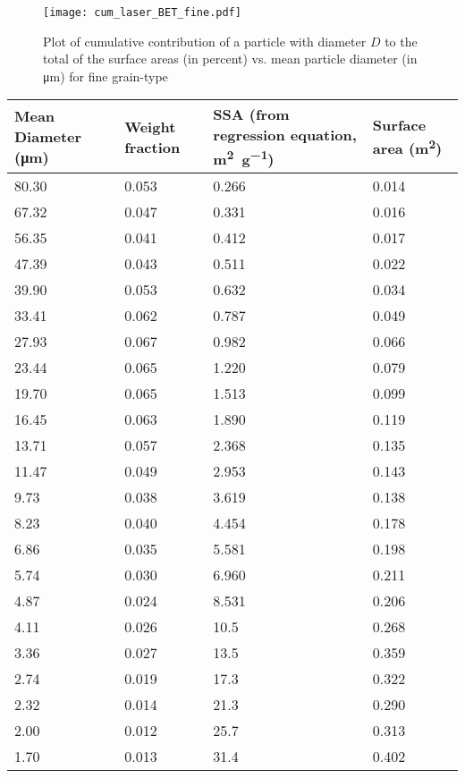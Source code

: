  
\begin{figure}[h]
\centering
\texttt{[image: cum\_laser\_BET\_fine.pdf]}
\caption{Plot of cumulative contribution of a particle with diameter $D$ to the total of the surface areas (in percent) vs. mean particle diameter (in \si{\micro\meter}) for fine grain-type}
\label{fig:app_contri}
\end{figure}
 
 \begin{table}[h!]
   \centering
     \begin{tabularx}{\linewidth}{|X|X|X|X|}
     \toprule
    \textbf{Mean Diameter (\si{\micro\meter})} & \textbf{Weight fraction} & \textbf{SSA  (from regression equation, \si{\square\meter\per\gram})} & \textbf{Surface area (\si{\square\metre})} \\
    \midrule
     80.30 & 0.053 & 0.266 & 0.014 \\
     67.32 & 0.047 & 0.331 & 0.016 \\
     56.35 & 0.041 & 0.412 & 0.017 \\
     47.39 & 0.043 & 0.511 & 0.022 \\
     39.90 & 0.053 & 0.632 & 0.034 \\
     33.41 & 0.062 & 0.787 & 0.049 \\
     27.93 & 0.067 & 0.982 & 0.066 \\
     23.44 & 0.065 & 1.220 & 0.079 \\
     19.70 & 0.065 & 1.513 & 0.099 \\
     16.45 & 0.063 & 1.890 & 0.119 \\
     13.71 & 0.057 & 2.368 & 0.135 \\
     11.47 & 0.049 & 2.953 & 0.143 \\
     9.73 & 0.038 & 3.619 & 0.138 \\
     8.23 & 0.040 & 4.454 & 0.178 \\
     6.86 & 0.035 & 5.581 & 0.198 \\
     5.74 & 0.030 & 6.960 & 0.211 \\
     4.87 & 0.024 & 8.531 & 0.206 \\
     4.11 & 0.026 & 10.5 & 0.268 \\
     3.36 & 0.027 & 13.5 & 0.359 \\
     2.74 & 0.019 & 17.3 & 0.322 \\
     2.32 & 0.014 & 21.3 & 0.290 \\
     2.00 & 0.012 & 25.7 & 0.313 \\
     1.70 & 0.013 & 31.4 & 0.402 \\

\end{tabularx}
\end{table}
